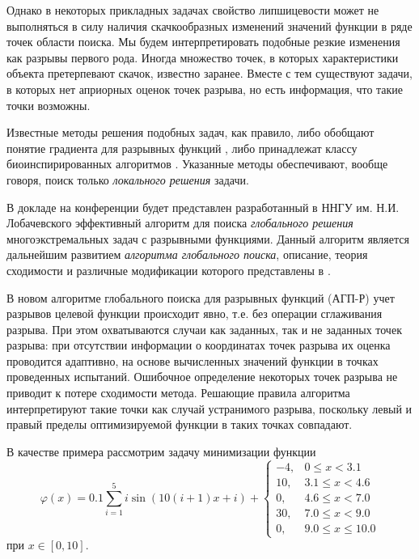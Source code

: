 \documentclass[11pt, oneside, a4paper]{article}
\begin{document}
Однако в некоторых прикладных задачах свойство липшицевости может не выполняться в силу наличия скачкообразных изменений значений функции в ряде точек области поиска. Мы будем интерпретировать подобные резкие изменения как разрывы первого рода. Иногда множество точек, в которых характеристики объекта претерпевают скачок, известно заранее. Вместе с тем существуют задачи, в которых нет априорных оценок точек разрыва, но есть информация, что такие точки возможны.

Известные методы решения подобных задач, как правило, либо обобщают понятие градиента для разрывных функций \cite{Batuhtin1997}, либо принадлежат классу биоинспирированных алгоритмов \cite{Jihui}. Указанные методы обеспечивают, вообще говоря, поиск только \textit{локального решения} задачи. 

В докладе на конференции будет представлен разработанный в ННГУ им. Н.И. Лобачевского эффективный алгоритм для поиска \textit{глобального решения} многоэкстремальных задач с разрывными функциями. 
Данный алгоритм является дальнейшим развитием \textit{алгоритма глобального поиска}, описание, теория сходимости и различные модификации которого представлены в \cite{Strongin2013}. 

В новом алгоритме глобального поиска для разрывных функций (АГП-Р) учет разрывов целевой функции происходит явно, т.е. без операции сглаживания разрыва. 
При этом охватываются случаи как заданных, так и не заданных точек разрыва: при отсутствии информации о координатах точек разрыва их оценка проводится адаптивно, на основе вычисленных значений функции в точках проведенных испытаний.  
Ошибочное определение некоторых точек разрыва не приводит к потере сходимости метода. Решающие правила алгоритма интерпретируют такие точки как случай устранимого разрыва, поскольку левый и правый пределы оптимизируемой функции в таких точках совпадают.



В качестве примера рассмотрим задачу минимизации функции
\begin{equation}\label{test}
\varphi(x) = 0.1 \sum_{i=1}^5{i\sin(10(i+1)x+i)}+
\begin{cases}
	-4,  &0   \leq x < 3.1\\
	10,  &3.1 \leq x < 4.6\\
	 0,  &4.6 \leq x < 7.0\\
	30,  &7.0 \leq x < 9.0\\
	 0,  &9.0 \leq x \leq 10.0
\end{cases}
\end{equation}
при $x\in[0,10]$. 
\end{document}
